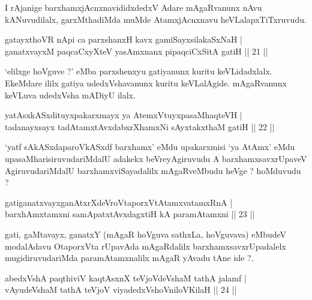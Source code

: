 \begin{artha}
I rAjanige barxhamxjAcnxnavididxdedxV Adare mAgaRvanunx nAvu kANuvudilalx, garxMthadiMda muMde AtamxjAcnxnavu heVLalapxTiTxruvudu. 
\end{artha}

\begin{shl}
gatayxthoVR nApi ca parxshanxH kavx gamiSayxsilakaSxNaH |\\
ganatxvayxM paqcaCxyXteV yasAmxnanx pipaqciCxSitA gatiH \hfill || 21 || 
\end{shl}

\begin{artha}
`elilxge hoVguve ?' eMba parxshenxyu gatiyanunx kuritu keVLidadxlalx. EkeMdare ililx gatiya udedxVshavanunx kuritu keVLalAgide. mAgaRvanunx keVLuva udedxVsha mADiyU ilalx.
\end{artha}


\begin{shl}
yatAsxkASxdituyxpakarxmayx ya AtemxVtuyxpasaMhaqteVH |\\
tadanayxsayx tadAtamxtAvxdabxrXhamxNi sAyxtakxthaM gatiH \hfill || 22 || 
\end{shl}

\begin{artha}
`yatf sAkASxdaparoVkASxdf barxhamx' eMdu upakarxmisi `ya AtAmx' eMdu upasaMharisiruvudariMdalU adakekx beVreyAgiruvudu A barxhamxsavxrUpaveV AgiruvudariMdalU barxhamxviSayadalilx mAgaRveMbudu heVge ? hoMduvudu ?
\end{artha}

\begin{shl}
gatiganatxvayxganAtxrXdeVroVtaporxVtAtamxvatamxRnA |\\
barxhAmxtamxni samApatxtAvxdagxtiH kA paramAtamxni \hfill || 23 || 
\end{shl}

\begin{artha}
gati, gaMtavayx, ganatxY (mAgaR hoVguva sathxLa, hoVguvava) eMbudeV modalAdavu OtaporxVta rUpavAda mAgaRdalilx barxhamxsavxrUpadalelx mugidiruvudariMda paramAtamxnalilx mAgaR yAvadu tAne ide ?.
\end{artha}


\begin{shl}
abedxVshA paqthiviV kaqtAsxnX teVjoVdeVshaM tathA jalamf |\\
vAyudeVshaM tathA teVjoV viyadedxVshoV\s niloV\s KilaH \hfill || 24 || 
\end{shl}

